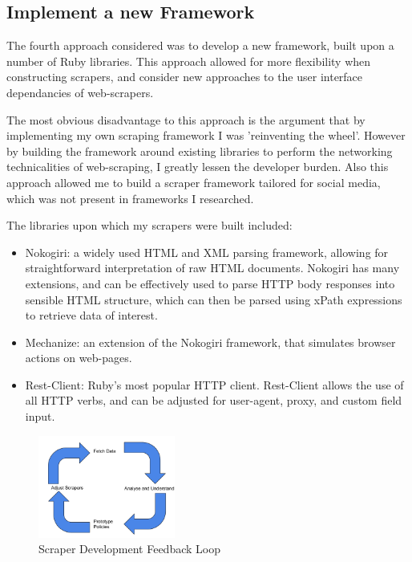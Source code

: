 \subsection{Implement a new Framework}

The fourth approach considered was to develop a new framework, built upon a number of Ruby libraries. This approach allowed for more flexibility when constructing scrapers, and consider new approaches to the user interface dependancies of web-scrapers. 

The most obvious disadvantage to this approach is the argument that by implementing my own scraping framework I was 'reinventing the wheel'. However by building the framework around existing libraries to perform the networking technicalities of web-scraping, I greatly lessen the developer burden. Also this approach allowed me to build a scraper framework tailored for social media, which was not present in frameworks I researched. 



The libraries upon which my scrapers were built included:

\begin{itemize}
 \item Nokogiri: a widely used HTML and XML parsing framework, allowing for straightforward interpretation of raw HTML documents. Nokogiri has many extensions, and can be effectively used to parse HTTP body responses into sensible HTML structure, which can then be parsed using xPath expressions to retrieve data of interest.
 \item Mechanize: an extension of the Nokogiri framework, that simulates browser actions on web-pages. 
 \item Rest-Client: Ruby's most popular HTTP client. Rest-Client allows the use of all HTTP verbs, and can be adjusted for user-agent, proxy, and custom field input.
\end{itemize}




\begin{figure}[h!]
\centering
\includegraphics[width=0.4\textwidth]{Images/Implementation_Lifecycle.pdf}
\caption{Scraper Development Feedback Loop}
\end{figure}


